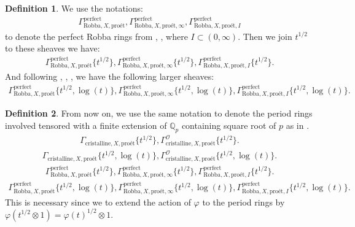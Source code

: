 \documentclass[12pt]{book}
\theoremstyle{definition}
\newtheorem{definition}{Definition}
\begin{document}
\begin{definition}
We use the notations:
\begin{align}
\Gamma^\mathrm{perfect}_{\text{Robba},X,\text{pro\'et}},\Gamma^\mathrm{perfect}_{\text{Robba},X,\text{pro\'et},\infty},\Gamma^\mathrm{perfect}_{\text{Robba},X,\text{pro\'et},I}
\end{align}
to denote the perfect Robba rings from \cite{KL1}, \cite{KL2}, where $I\subset (0,\infty)$. Then we join $t^{1/2}$ to these sheaves we have:
\begin{align}
\Gamma^\mathrm{perfect}_{\text{Robba},X,\text{pro\'et}}\{t^{1/2}\},\Gamma^\mathrm{perfect}_{\text{Robba},X,\text{pro\'et},\infty}\{t^{1/2}\},\Gamma^\mathrm{perfect}_{\text{Robba},X,\text{pro\'et},I}\{t^{1/2}\}.
\end{align}
And following \cite{BL1}, \cite{BL2}, \cite{Fon1}, \cite{BHS} we have the following larger sheaves:
\begin{align}
\Gamma^\mathrm{perfect}_{\text{Robba},X,\text{pro\'et}}\{t^{1/2},\log(t)\},\Gamma^\mathrm{perfect}_{\text{Robba},X,\text{pro\'et},\infty}\{t^{1/2},\log(t)\},\Gamma^\mathrm{perfect}_{\text{Robba},X,\text{pro\'et},I}\{t^{1/2},\log(t)\}.
\end{align} 
\end{definition}



\begin{definition}
From now on, we use the same notation to denote the period rings involved tensored with a finite extension of $\mathbb{Q}_p$ containing square root of $p$ as in \cite{BS}.
\begin{align}
\Gamma_{\text{cristalline},X,\text{pro\'et}}\{t^{1/2}\},\Gamma^\mathcal{O}_{\text{cristalline},X,\text{pro\'et}}\{t^{1/2}\}.
\end{align}
\begin{align}
\Gamma_{\text{cristalline},X,\text{pro\'et}}\{t^{1/2},\log(t)\},\Gamma^\mathcal{O}_{\text{cristalline},X,\text{pro\'et}}\{t^{1/2},\log(t)\}.
\end{align}
\begin{align}
\Gamma^\mathrm{perfect}_{\text{Robba},X,\text{pro\'et}}\{t^{1/2}\},\Gamma^\mathrm{perfect}_{\text{Robba},X,\text{pro\'et},\infty}\{t^{1/2}\},\Gamma^\mathrm{perfect}_{\text{Robba},X,\text{pro\'et},I}\{t^{1/2}\}.
\end{align}
\begin{align}
\Gamma^\mathrm{perfect}_{\text{Robba},X,\text{pro\'et}}\{t^{1/2},\log(t)\},\Gamma^\mathrm{perfect}_{\text{Robba},X,\text{pro\'et},\infty}\{t^{1/2},\log(t)\},\Gamma^\mathrm{perfect}_{\text{Robba},X,\text{pro\'et},I}\{t^{1/2},\log(t)\}.
\end{align}
This is necessary since we to extend the action of $\varphi$ to the period rings by $\varphi(t^{1/2}\otimes 1)=\varphi(t)^{1/2}\otimes 1$.
\end{definition}
\end{document}
